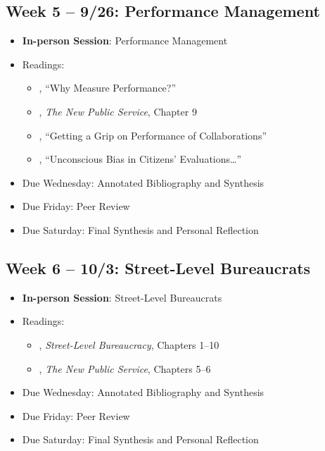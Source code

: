 \documentclass[12pt, letterpaper]{article}
\begin{document}
\subsection*{Week 5 -- 9/26: Performance Management}
\begin{itemize}
    \item \textbf{In-person Session}: Performance Management
    \item Readings:
        \begin{itemize}
            \item \citet{Behn2003}, ``Why Measure Performance?'' 
            \item \citet{Denhardt2015}, \emph{The New Public Service}, Chapter 9 
            \item \citet{douglas2021}, ``Getting a Grip on Performance of Collaborations'' 
            \item \citet{marvel2015}, ``Unconscious Bias in Citizens' Evaluations\dots'' 
        \end{itemize}
        \item Due Wednesday: Annotated Bibliography and Synthesis
        \item Due Friday: Peer Review
        \item Due Saturday: Final Synthesis and Personal Reflection
\end{itemize}

\subsection*{Week 6 -- 10/3: Street-Level Bureaucrats}
\begin{itemize}
    \item \textbf{In-person Session}: Street-Level Bureaucrats
    \item Readings:
        \begin{itemize}
            \item \citet{Lipsky2010}, \emph{Street-Level Bureaucracy}, Chapters 1--10 
            \item \citet{Denhardt2015}, \emph{The New Public Service}, Chapters 5--6 
        \end{itemize}
        \item Due Wednesday: Annotated Bibliography and Synthesis
        \item Due Friday: Peer Review
        \item Due Saturday: Final Synthesis and Personal Reflection
\end{itemize}
\end{document}

